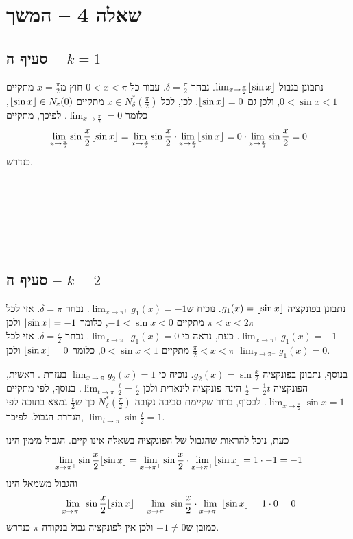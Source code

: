 \documentclass[11pt, oneside]{article}
\newcommand{\qed}{\R{$\blacksquare$}}
\newcommand{\br}{\\\\\\\\\\\\\\}
\newcommand{\q}[3]{\R{שאלה #3#2.#1}}
\newcommand{\m}[3]{\R{משפט #3#2.#1}}
\DeclarePairedDelimiter{\floor}{\lfloor}{\rfloor}
\begin{document}
\section*{שאלה 4 -- המשך}
\subsection*{סעיף ה -- $k = 1$}
נתבונן בגבול $\lim_{x \to \frac{\pi}{2}} \floor{\sin{x}}$. נבחר $\delta = \frac{\pi}{2}$. עבור כל $0 < x < \pi$ חוץ מ$x = \frac{\pi}{2}$ מתקיים $0 < \sin{x} < 1$, ולכן גם $\floor{\sin{x}} = 0$. לכן, לכל $x \in N^{*}_{\delta}\left(\frac{\pi}{2}\right)$ מתקיים $\floor{\sin{x}} \in N_{\varepsilon}(0)$, כלומר $\lim_{x \to \frac{\pi}{2}} = 0$. לפיכך, מתקיים
\[
\lim_{x \to \frac{\pi}{2}} \sin{\frac{x}{2}}\floor{\sin{x}} = \lim_{x \to \frac{x}{2}} \sin{\frac{x}{2}} \cdot \lim_{x \to \frac{x}{2}} \floor{\sin{x}} = 0 \cdot \lim_{x \to \frac{x}{2}} \sin{\frac{x}{2}} = 0
\]
כנדרש.
\br\qed

\subsection*{סעיף ה -- $k = 2$}
נתבונן בפונקציה $g_{1}(x) = \floor{\sin{x}}$. נוכיח ש$\lim_{x \to \pi^{+}}g_{1}(x) = -1$. נבחר $\delta = \pi$. אזי לכל $\pi < x < 2\pi$ מתקיים $-1 < \sin{x} < 0$, כלומר $\floor{\sin{x}} = -1$ ולכן $\lim_{x \to \pi^{+}} g_{1}(x) = -1$.
כעת, נראה כי $\lim_{x \to \pi^{-}} g_{1}(x) = 0$. נבחר $\delta = \frac{\pi}{2}$. אזי לכל $\frac{\pi}{2} < x < \pi$ מתקיים $0 < \sin{x} < 1$, כלומר $\floor{\sin{x}} = 0$ ולכן $\lim_{x \to \pi^{-}} g_{1}(x) = 0$.

בנוסף, נתבונן בפונקציה $g_{2}(x) = \sin{\frac{x}{2}}$. נוכיח כי $\lim_{x \to \pi} g_{2}(x) = 1$ בעזרת \m{4}{93}{}. ראשית, הפונקציה $\frac{t}{2} = \frac{1}{2}t$ הינה פונקציה לינארית ולכן $\lim_{t \to \pi} \frac{t}{2} = \frac{\pi}{2}$. בנוסף, לפי \q{4}{77}{} מתקיים $\lim_{x \to \frac{\pi}{2}} \sin{x} = 1$. לבסוף, ברור שקיימת סביבה נקובה $N^{*}_{\delta}(\frac{\pi}{2})$ כך ש$\frac{t}{2}$ נמצא בתוכה לפי הגדרת הגבול. לפיכך, $\lim_{t \to \pi} \sin{\frac{t}{2}} = 1$.

כעת, נוכל להראות שהגבול של הפונקציה בשאלה אינו קיים. הגבול מימין הינו
\[
\lim_{x \to \pi^{+}} \sin{\frac{x}{2}}\floor{\sin{x}} = \lim_{x \to \pi^{+}} \sin{\frac{x}{2}} \cdot \lim_{x \to \pi^{+}} \floor{\sin{x}} = 1 \cdot -1 = -1
\]
והגבול משמאל הינו
\[
\lim_{x \to \pi^{-}} \sin{\frac{x}{2}}\floor{\sin{x}} = \lim_{x \to \pi^{-}} \sin{\frac{x}{2}} \cdot \lim_{x \to \pi^{-}} \floor{\sin{x}} = 1 \cdot 0 = 0
\]
כמובן ש$-1 \neq 0$ ולכן אין לפונקציה גבול בנקודה $\pi$ כנדרש.
\br\qed
\end{document}
